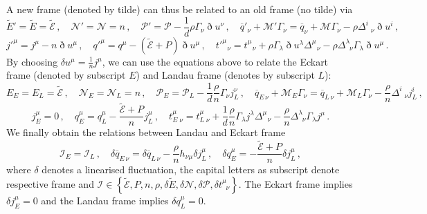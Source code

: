 \documentclass[superscriptaddress,prd,nofootinbib,preprintnumbers,longbibliography,11pt,eqsecnum]{revtex4-1}
\begin{document}
\begin{appendix}
A new frame (denoted by tilde) can thus be related to an old frame (no tilde) via
\begin{equation}
	\tilde{E}'=\tilde{E}
	=
	\tilde{\mathcal{E}}
	\,,
	\quad
	\mathcal{N}'
	=
	\mathcal{N}
	=
	n
	\,,
	\quad
	\mathcal{P}'
	=
	\mathcal{P}
	-
	\frac{1}{d}\rho\Gamma_{\nu}\eth u^{\nu}
	\,,
	\quad
	\overline{q}'_{\nu}
	+
	\mathcal{M}'
	\Gamma_{\nu}
	=
	\overline{q}_{\nu}
	+
	\mathcal{M}
	\Gamma_{\nu}
	-
	\rho
	\Delta^{i}_{\;\;\,\nu}\eth u^{i}
	\,,
\end{equation}
\begin{equation}
	j'^{\mu}
	=
	j^{\mu}
	-
	n \eth u^{\mu}
	\,,
	\quad
	q'^{\mu}
	=
	q^{\mu}
	-
	(\tilde{\mathcal{E}}+P)\eth u^{\mu}
	\,,
	\quad
	t'^{\mu}_{\;\;\,\nu}
	=
	t^{\mu}_{\;\;\,\nu}
	+
	\rho \Gamma_{\lambda}\eth u^{\lambda}\Delta^{\mu}_{\;\;\,\nu}
	-
	\rho \Delta^{\lambda}_{\;\;\nu}\Gamma_{\lambda}\eth u^{\mu}
	\,.
\end{equation}
By choosing $\delta u^{\mu}=\frac{1}{n}j^{\mu}$, we can use the equations above to relate the Eckart frame (denoted by subscript $E$) and Landau frame (denotes by subscript $L$):
\begin{equation}\label{eq:switch1}
	E_{E}=E_{L}=\tilde{\mathcal{E}}
	\,,
	\quad
	\mathcal{N}_{E}
	=
	\mathcal{N}_{L}
	=
	n
	\,,
	\quad
	\mathcal{P}_{E}
	=
	\mathcal{P}_{L}
	-
	\frac{1}{d}\frac{\rho}{n}\Gamma_{\nu} j^{\nu}_{L}
	\,,
	\quad
	\overline{q}_{E\,\nu}
	+
	\mathcal{M}_{E}
	\Gamma_{\nu}
	=
	\overline{q}_{L\,\nu}
	+
	\mathcal{M}_{L}
	\Gamma_{\nu}
	-
	\frac{\rho}{n}
	\Delta^{i}_{\;\;\,\nu} j^{i}_{L}
	\,,
\end{equation}
\begin{equation}\label{eq:switch2}
	j_{E}^{\mu}
	=
	0
	\,,
	\quad
	q^{\mu}_{E}
	=
	q^{\mu}_{L}
	-
	\frac{\tilde{\mathcal{E}}+P}{n} j_{L}^{\mu}
	\,,
	\quad
	t^{\mu}_{E\;\nu}
	=
	t^{\mu}_{L\;\nu}
	+
	\frac{1}{d}
	\frac{\rho}{n} \Gamma_{\lambda}j^{\lambda}\Delta^{\mu}_{\;\;\,\nu}
	-
	\frac{\rho}{n} \Delta^{\lambda}_{\;\;\nu}\Gamma_{\lambda}j^{\mu}
\,.
\end{equation}
We finally obtain the relations between Landau and Eckart frame
\begin{equation}\label{eq:relating}
	 \mathcal{I}_{E}
	=
	 \mathcal{I}_{L}
	\,,
	\quad	
	\delta \overline{q}_{E\,\nu}
	=
	\delta \overline{q}_{L\,\nu}
	-
	\frac{\rho}{n}
	h_{\nu\mu}\delta j^{\mu}_{L}
	\,,
	\quad
	\delta q^{\mu}_{E}
	=
	-
	\frac{\tilde{\mathcal{E}}+P}{n} \delta j_{L}^{\mu}
	\,,
\end{equation}
where $\delta$ denotes a linearised fluctuation, the capital letters as subscript denote respective frame and $\mathcal{I}\in\left\{\tilde{\mathcal{E}},P,n,\rho,\delta\tilde{E},\delta\mathcal{N},\delta\mathcal{P},\delta t^{\mu}_{\;\;\nu}\right\}$. The Eckart frame implies $\delta j^{\mu}_{E}=0$ and the Landau frame implies $\delta q^{\mu}_{L}=0$.





\end{appendix}
\end{document}
